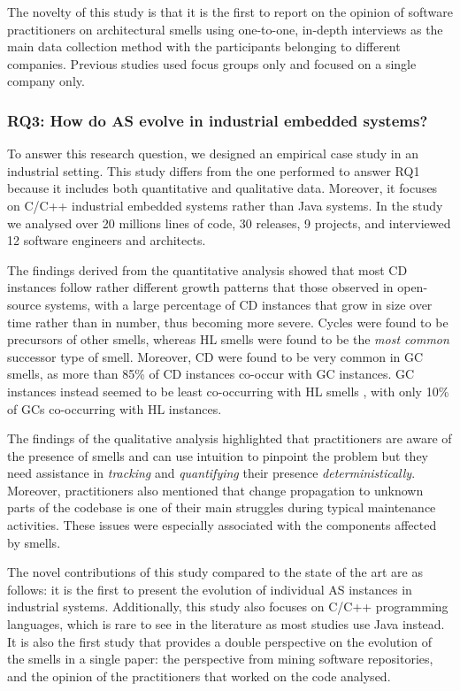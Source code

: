 The novelty of this study is that it is the first to report on the opinion of software practitioners on architectural smells using one-to-one, in-depth interviews as the main data collection method with the participants belonging to different companies. Previous studies used focus groups only and focused on a single company only.

\subsubsection*{RQ3: How do AS evolve in industrial embedded systems?}
To answer this research question, we designed an empirical case study in an industrial setting.
This study differs from the one performed to answer RQ1 because it includes both quantitative and qualitative data. Moreover, it focuses on C/C++ industrial embedded systems rather than Java systems.
In the study we analysed over 20 millions lines of code, 30 releases, 9 projects, and interviewed 12 software engineers and architects.

The findings derived from the quantitative analysis showed that most CD instances follow rather different growth patterns that those observed in open-source systems, with a large percentage of CD instances that grow in size over time rather than in number, thus becoming more severe.
Cycles were found to be precursors of other smells, whereas HL smells were found to be the \emph{most common} successor type of smell.
Moreover, CD were found to be very common in GC smells, as more than 85\% of CD instances co-occur with GC instances.
GC instances instead seemed to be least co-occurring with HL smells , with only 10\% of GCs co-occurring with HL instances.

The findings of the qualitative analysis highlighted that practitioners are aware of the presence of smells and can use intuition to pinpoint the problem but they need assistance in \emph{tracking} and \emph{quantifying} their presence \emph{deterministically}.
Moreover, practitioners also mentioned that change propagation to unknown parts of the codebase is one of their main struggles during typical maintenance activities.
These issues were especially associated with the components affected by smells. 

The novel contributions of this study compared to the state of the art are as follows: it is the first to present the evolution of individual AS instances in industrial systems. Additionally, this study also focuses on C/C++ programming languages, which is rare to see in the literature as most studies use Java instead.
It is also the first study that provides a double perspective on the evolution of the smells in a single paper: the perspective from mining software repositories, and the opinion of the practitioners that worked on the code analysed.

